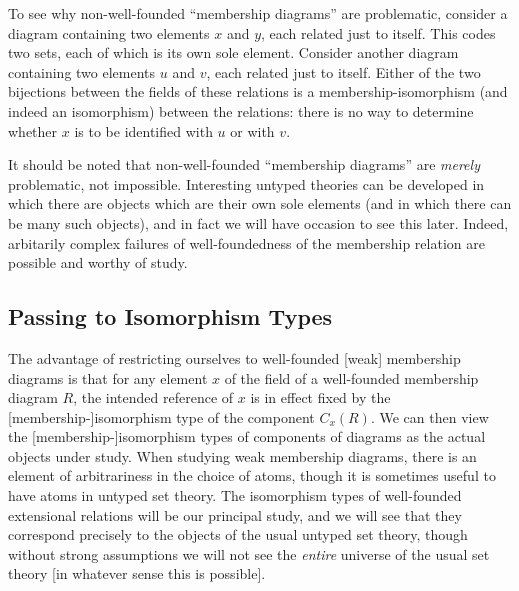 \documentclass[12pt]{book}
\begin{document}
To see why non-well-founded ``membership diagrams'' are problematic,
consider a diagram containing two elements $x$ and $y$, each related
just to itself.  This codes two sets, each of which is its own sole
element.  Consider another diagram containing two elements $u$ and
$v$, each related just to itself.  Either of the two bijections
between the fields of these relations is a membership-isomorphism (and
indeed an isomorphism) between the relations: there is no way to
determine whether $x$ is to be identified with $u$ or with $v$.

It should be noted that non-well-founded ``membership diagrams'' are {\em
merely\/} problematic, not impossible.  Interesting untyped theories
can be developed in which there are objects which are their own sole
elements (and in which there can be many such objects), and in fact we
will have occasion to see this later.  Indeed, arbitarily complex
failures of well-foundedness of the membership relation are possible
and worthy of study.

\newpage

\subsection{Passing to Isomorphism Types}

The advantage of restricting ourselves to well-founded [weak]
membership diagrams is that for any element $x$ of the field of a
well-founded membership diagram $R$, the intended reference of $x$ is
in effect fixed by the [membership-]isomorphism type of the component
$C_x(R)$.  We can then view the [membership-]isomorphism types of
components of diagrams as the actual objects under study.  When
studying weak membership diagrams, there is an element of
arbitrariness in the choice of atoms, though it is sometimes useful to
have atoms in untyped set theory.  The isomorphism types of
well-founded extensional relations will be our principal study, and we
will see that they correspond precisely to the objects of the usual
untyped set theory, though without strong assumptions we will not see
the {\em entire\/} universe of the usual set theory [in whatever sense
this is possible].
\end{document}
